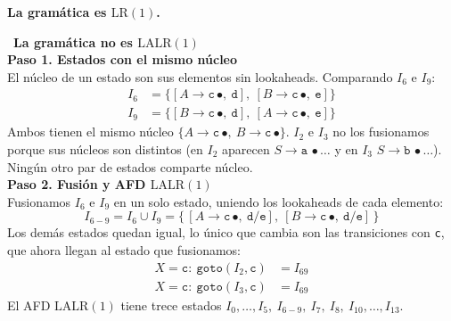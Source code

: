 \documentclass[12pt,letterpaper]{article}
\newcommand{\nt}[1]{\textit{#1}}
\newcommand{\tk}[1]{\texttt{#1}}
\newcommand{\lr}{\mathrm{LR(1)}}
\newcommand{\lalr}{\mathrm{LALR(1)}}
\begin{document}
\begin{enumerate}[label=\arabic*.]
  \textbf{La gramática es $\lr$.}

  \bigskip

  \ \textbf{\large La gramática no es $\lalr$}\\

  \textbf{Paso 1. Estados con el mismo núcleo}\\
  El núcleo de un estado son sus elementos sin lookaheads. Comparando $I_6$ e $I_9$:
  \[
  \begin{aligned}
    I_6 &= \{[\nt{A}\to\tk{c}\,\bullet,\ \tk{d}],\ [\nt{B}\to\tk{c}\,\bullet,\ \tk{e}]\} \\
    I_9 &= \{[\nt{B}\to\tk{c}\,\bullet,\ \tk{d}],\ [\nt{A}\to\tk{c}\,\bullet,\ \tk{e}]\}
  \end{aligned}
  \]
  Ambos tienen el mismo núcleo $\{\nt{A}\to\tk{c}\,\bullet,\ \nt{B}\to\tk{c}\,\bullet\}$. $I_2$ e $I_3$ no los
  fusionamos porque sus núcleos son distintos (en $I_2$ aparecen $\nt{S}\to\tk{a}\,\bullet\ldots$ y en $I_3$
  $\nt{S}\to\tk{b}\,\bullet\ldots$). Ningún otro par de estados comparte núcleo.\\

  \textbf{Paso 2. Fusión y AFD $\lalr$}\\
  Fusionamos $I_6$ e $I_9$ en un solo estado, uniendo los lookaheads de cada elemento:
  \[
  I_{6-9} = I_6 \cup I_9 = \{\,[\nt{A}\to\tk{c}\,\bullet,\ \tk{d}/\tk{e}],\ [\nt{B}\to\tk{c}\,\bullet,\ \tk{d}/\tk{e}]\,\}
  \]
  Los demás estados quedan igual, lo único que cambia son las transiciones con \tk{c}, que ahora llegan al
  estado que fusionamos:
  \[
  \begin{aligned}
    X=\tk{c}:\ \texttt{goto}(I_2,\tk{c}) &= \boxed{I_{69}}\\[3pt]
    X=\tk{c}:\ \texttt{goto}(I_3,\tk{c}) &= \boxed{I_{69}}
  \end{aligned}
  \]
  El AFD $\lalr$ tiene trece estados $I_0,\ldots,I_5,\ I_{6-9},\ I_7,\ I_8,\ I_{10},\ldots,I_{13}$.\\


\end{enumerate}
\end{document}
